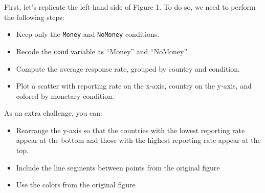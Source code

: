 \documentclass[12pt,halfline,a4paper,]{ouparticle}
\providecommand{\tightlist}{%
  \setlength{\itemsep}{0pt}\setlength{\parskip}{0pt}}
\begin{document}
First, let's replicate the left-hand side of Figure 1. To do so, we need
to perform the following steps:

\begin{itemize}
\tightlist
\item
  Keep only the \texttt{Money} and \texttt{NoMoney} conditions.
\item
  Recode the \texttt{cond} variable as ``Money'' and ``NoMoney''.
\item
  Compute the average response rate, grouped by country and condition.
\item
  Plot a scatter with reporting rate on the x-axis, country on the
  y-axis, and colored by monetary condition.
\end{itemize}

As an extra challenge, you can:

\begin{itemize}
\tightlist
\item
  Rearrange the y-axis so that the countries with the lowest reporting
  rate appear at the bottom and those with the highest reporting rate
  appear at the top.
\item
  Include the line segments between points from the original figure
\item
  Use the colors from the original figure
\end{itemize}
\end{document}
